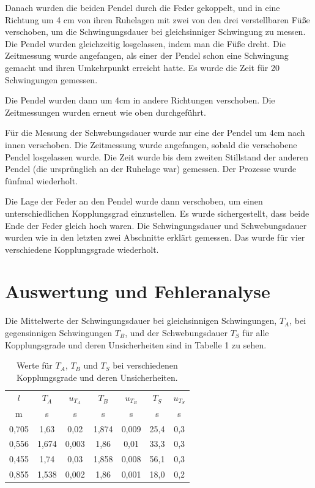 \documentclass[11pt,a4paper]{article}
\begin{document}
Danach wurden die beiden Pendel durch die Feder gekoppelt, und in eine Richtung um 4 cm von ihren Ruhelagen mit zwei von den drei verstellbaren Füße verschoben, um die Schwingungsdauer bei gleichsinniger Schwingung zu messen. Die Pendel wurden gleichzeitig losgelassen, indem man die Füße dreht. Die Zeitmessung wurde angefangen, als einer der Pendel schon eine Schwingung gemacht und ihren Umkehrpunkt erreicht hatte. Es wurde die Zeit für 20 Schwingungen gemessen. 

Die Pendel wurden dann um 4cm in andere Richtungen verschoben. Die Zeitmessungen wurden erneut wie oben durchgeführt. 

Für die Messung der Schwebungsdauer wurde nur eine der Pendel um 4cm nach innen verschoben. Die Zeitmessung wurde angefangen, sobald die verschobene Pendel losgelassen wurde. Die Zeit wurde bis dem zweiten Stillstand der anderen Pendel (die ursprünglich an der Ruhelage war) gemessen. Der Prozesse wurde fünfmal wiederholt. 

Die Lage der Feder an den Pendel wurde dann verschoben, um einen unterschiedlichen Kopplungsgrad einzustellen. Es wurde sichergestellt, dass beide Ende der Feder gleich hoch waren. Die Schwingungsdauer und Schwebungsdauer wurden wie in den letzten zwei Abschnitte erklärt gemessen. Das wurde für vier verschiedene Kopplungsgrade wiederholt. 

\section{Auswertung und Fehleranalyse}
Die Mittelwerte der Schwingungsdauer bei gleichsinnigen Schwingungen, $T_A$, bei gegensinnigen Schwingungen $T_B$, und der Schwebungsdauer $T_S$ für alle Kopplungsgrade und deren Unsicherheiten sind in Tabelle 1 zu sehen. 
\begin{table} [h]
	\begin{tabular*}{0.99\textwidth}{@{\extracolsep{\fill}}c|cccccc}
		\toprule
		$l$ & $T_A$ & $u_{T_A}$ & $T_B$ & $u_{T_B}$ & $T_S$ & $u_{T_S}$  \\
		m & s & s & s & s & s & s   \\
		\bottomrule
		0,705 & 1,63 & 0,02 & 1,874 & 0,009 & 25,4 & 0,3 \\
		0,556 & 1,674 & 0,003 & 1,86 & 0,01 & 33,3 & 0,3 \\
		0,455 & 1,74 & 0,03 & 1,858 & 0,008 & 56,1 & 0,3\\
		0,855 & 1,538 & 0,002 & 1,86 & 0,001 & 18,0 & 0,2 \\
		\bottomrule
	\end{tabular*}
	\caption{Werte für $T_A$, $T_B$ und $T_S$ bei verschiedenen Kopplungsgrade und deren Unsicherheiten.}
\end{table}
\end{document}
